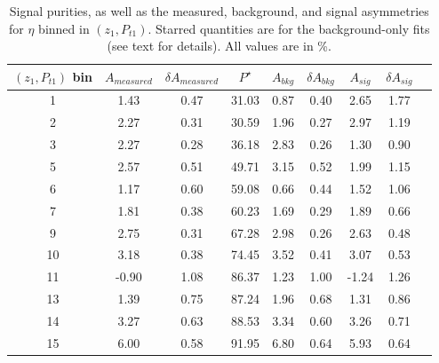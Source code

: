 \begin{table}[H]\footnotesize
\centering
\begin{tabular}{|c|c|c|c|c|c|c|c|c|}
\hline
$(z_{1},P_{t1})$ bin & $A_{measured}$ & $\delta A_{measured}$ & $P^{\star}$ & $A_{bkg}$ & $\delta A_{bkg}$ &  $ A_{sig}$  & $\delta A_{sig}$ \\ \hline \hline
1 & 1.43 & 0.47 & 31.03 & 0.87 & 0.40 & 2.65  & 1.77 \\ \hline 
2 & 2.27 & 0.31 & 30.59 & 1.96 & 0.27 & 2.97  & 1.19 \\ \hline 
3 & 2.27 & 0.28 & 36.18 & 2.83 & 0.26 & 1.30  & 0.90 \\ \hline \hline 
5 & 2.57 & 0.51 & 49.71 & 3.15 & 0.52 & 1.99  & 1.15 \\ \hline 
6 & 1.17 & 0.60 & 59.08 & 0.66 & 0.44 & 1.52 & 1.06 \\ \hline 
7 & 1.81 & 0.38 & 60.23 & 1.69 & 0.29 & 1.89  & 0.66 \\ \hline \hline
9 & 2.75 & 0.31 & 67.28 & 2.98 & 0.26 & 2.63  & 0.48 \\ \hline 
10 & 3.18 & 0.38 & 74.45 & 3.52 & 0.41 & 3.07 & 0.53 \\ \hline 
11 & -0.90 & 1.08 & 86.37 & 1.23 & 1.00 & -1.24  & 1.26 \\ \hline \hline
13 & 1.39 & 0.75 & 87.24 & 1.96 & 0.68 & 1.31  & 0.86 \\ \hline 
14 & 3.27 & 0.63 & 88.53 & 3.34 & 0.60 & 3.26  & 0.71 \\ \hline 
15 & 6.00 & 0.58 & 91.95 & 6.80 & 0.64 & 5.93  & 0.64 \\ \hline 
\end{tabular}
\caption[BG-correction quantities for $\eta$ asymmetries, $(z_1,P_{t1})$ bins]{Signal purities, as well as the measured, background, and signal asymmetries for $\eta$ binned in $(z_1,P_{t1})$. Starred quantities are for the background-only fits (see text for details). All values are in \%.}
\label{tab:etazptbkgcor}
\end{table} 


